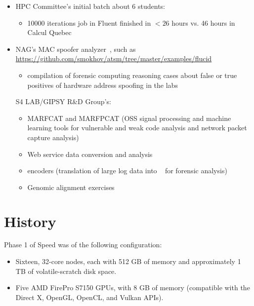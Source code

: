 \documentclass{easychair}
\begin{document}
\begin{itemize}
	\item 
HPC Committee's initial batch about 6 students:
\begin{itemize}
	\item 
10000 iterations job in Fluent finished in $<26$ hours vs. 46 hours in Calcul Quebec
\end{itemize}
	\item 
NAG's MAC spoofer analyzer~\cite{mac-spoofer-analyzer-intro-c3s2e2014,mac-spoofer-analyzer-detail-fps2014},
such as \url{https://github.com/smokhov/atsm/tree/master/examples/flucid}
\begin{itemize}
	\item 
compilation of forensic computing reasoning cases about false or true positives of hardware address spoofing in the labs
\end{itemize}
S4 LAB/GIPSY R\&D Group's:
\begin{itemize}
	\item 
MARFCAT and MARFPCAT (OSS signal processing and machine learning tools for 
vulnerable and weak code analysis and network packet capture
analysis)~\cite{marfcat-nlp-ai2014,marfcat-sate2010-nist,fingerprinting-mal-traffic}
	\item 
Web service data conversion and analysis
	\item 
{\flucid} encoders (translation of large log data into {\flucid}~\cite{mokhov-phd-thesis-2013} for forensic analysis)
	\item 
Genomic alignment exercises
\end{itemize}
\end{itemize}

\appendix

\section{History}

Phase 1 of Speed was of the following configuration:

\begin{itemize}
\item
Sixteen, 32-core nodes, each with 512 GB of memory and approximately 1 TB of volatile-scratch disk space. 
\item
Five AMD FirePro S7150 GPUs, with 8 GB of memory (compatible with the Direct X, OpenGL, OpenCL, and Vulkan APIs). 
\end{itemize}
\end{document}
